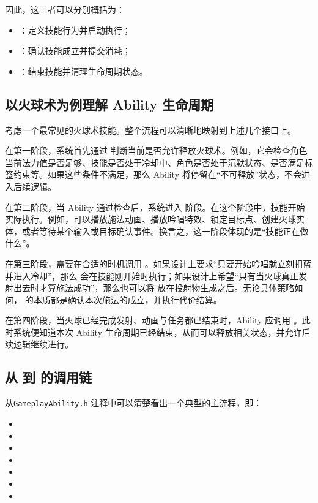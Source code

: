 因此，这三者可以分别概括为：

\begin{itemize}
	\item {}：定义技能行为并启动执行；
	\item {}：确认技能成立并提交消耗；
	\item {}：结束技能并清理生命周期状态。
\end{itemize}

\subsection{以火球术为例理解 Ability 生命周期}

考虑一个最常见的火球术技能。整个流程可以清晰地映射到上述几个接口上。

在第一阶段，系统首先通过  判断当前是否允许释放火球术。例如，它会检查角色当前法力值是否足够、技能是否处于冷却中、角色是否处于沉默状态、是否满足标签约束等。如果这些条件不满足，那么 Ability 将停留在“不可释放”状态，不会进入后续逻辑。

在第二阶段，当 Ability 通过检查后，系统进入  阶段。在这个阶段中，技能开始实际执行。例如，可以播放施法动画、播放吟唱特效、锁定目标点、创建火球实体，或者等待某个输入或目标确认事件。换言之，这一阶段体现的是“技能正在做什么”。

在第三阶段，需要在合适的时机调用 。如果设计上要求“只要开始吟唱就立刻扣蓝并进入冷却”，那么  会在技能刚开始时执行；如果设计上希望“只有当火球真正发射出去时才算施法成功”，那么也可以将  放在投射物生成之后。无论具体策略如何， 的本质都是确认本次施法的成立，并执行代价结算。

在第四阶段，当火球已经完成发射、动画与任务都已结束时，Ability 应调用 。此时系统便知道本次 Ability 生命周期已经结束，从而可以释放相关状态，并允许后续逻辑继续进行。

\subsection{从  到  的调用链}

从\texttt{GameplayAbility.h} 注释中可以清楚看出一个典型的主流程，即：
\begin{itemize}
	\item {}
	\item {}
	\item {}
	\item {}
	\item {}
	\item {}
	\item {}
\end{itemize}

